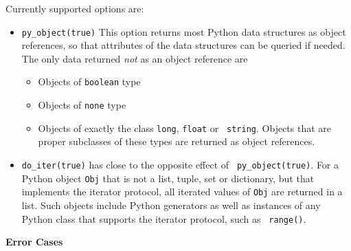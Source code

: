 \begin{description}
Currently supported options are:
\begin{itemize}
  \item {\tt py\_object(true)} This option returns most Python data
    structures as object references, so that attributes of the data
    structures can be queried if needed.  The only data returned {\em
      not} as an object reference are
    \begin{itemize}
    \item Objects of {\tt boolean} type
    \item Objects of {\tt none} type
    \item Objects of exactly the class {\tt long}, {\tt float} or {\tt
      string}.  Objects that are proper subclasses of these types are
      returned as object references.
    \end{itemize}
  \item {\tt do\_iter(true)} has close to the opposite effect of {\tt
    py\_object(true)}.  For a Python object {\tt Obj} that is not a
    list, tuple, set or dictionary, but that implements the iterator
    protocol, all iterated values of {\tt Obj} are returned in a list.
    Such objects include Python generators as well as instances of any
    Python class that supports the iterator protocol, such as {\tt
      range()}.
\end{itemize}

{\bf Error Cases}


\end{description}
